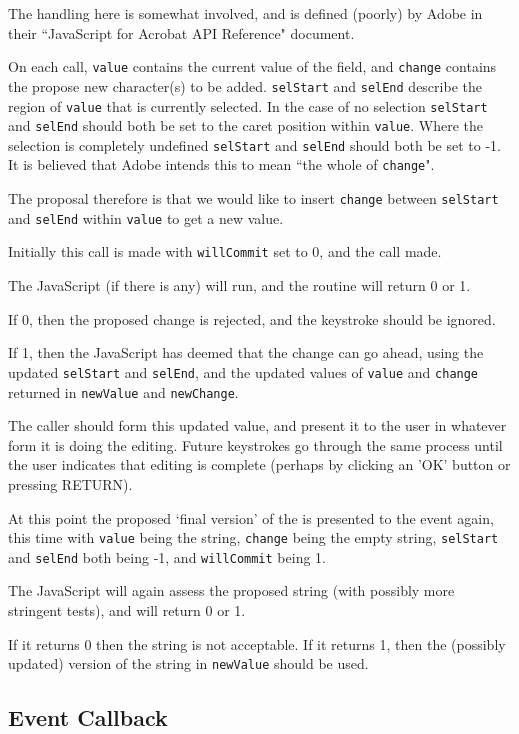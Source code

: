 \documentclass[oneside]{book}
\begin{document}
The handling here is somewhat involved, and is defined (poorly) by Adobe in their ``JavaScript for Acrobat API Reference" document.

On each call, \texttt{value} contains the current value of the field, and \texttt{change} contains the propose new character(s) to be added. \texttt{selStart} and \texttt{selEnd} describe the region of \texttt{value} that is currently selected. In the case of no selection \texttt{selStart} and \texttt{selEnd} should both be set to the caret position within \texttt{value}. Where the selection is completely undefined \texttt{selStart} and \texttt{selEnd} should both be set to -1. It is believed that Adobe intends this to mean ``the whole of \texttt{change}".

The proposal therefore is that we would like to insert \texttt{change} between \texttt{selStart} and \texttt{selEnd} within \texttt{value} to get a new value.

Initially this call is made with \texttt{willCommit} set to 0, and the call made.

The JavaScript (if there is any) will run, and the routine will return 0 or 1.

If 0, then the proposed change is rejected, and the keystroke should be ignored.

If 1, then the JavaScript has deemed that the change can go ahead, using the updated \texttt{selStart} and \texttt{selEnd}, and the updated values of \texttt{value} and \texttt{change} returned in \texttt{newValue} and \texttt{newChange}.

The caller should form this updated value, and present it to the user in whatever form it is doing the editing. Future keystrokes go through the same process until the user indicates that editing is complete (perhaps by clicking an 'OK' button or pressing RETURN).

At this point the proposed `final version' of the is presented to the event again, this time with \texttt{value} being the string, \texttt{change} being the empty string, \texttt{selStart} and \texttt{selEnd} both being -1, and \texttt{willCommit} being 1.

The JavaScript will again assess the proposed string (with possibly more stringent tests), and will return 0 or 1.

If it returns 0 then the string is not acceptable. If it returns 1, then the (possibly updated) version of the string in \texttt{newValue} should be used.

\subsection{Event Callback}
\label{EventCallback}
\end{document}
